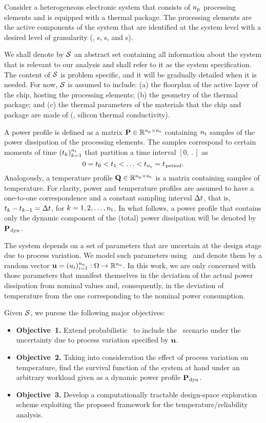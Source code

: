Consider a heterogeneous electronic system that consists of ${n_\text{p}}$ processing elements and is equipped with a thermal package.
The processing elements are the active components of the system that are identified at the system level with a desired level of granularity (\eg, s, s, and s).

We shall denote by $\mathcal{S}$ an abstract set containing all information about the system that is relevant to our analysis and shall refer to it as the system specification.
The content of $\mathcal{S}$ is problem specific, and it will be gradually detailed when it is needed.
For now, $\mathcal{S}$ is assumed to include: (a) the floorplan of the active layer of the chip, hosting the processing elements; (b) the geometry of the thermal package; and (c) the thermal parameters of the materials that the chip and package are made of (\eg, silicon thermal conductivity).

A power profile is defined as a matrix $\mathbf{P} \in \mathbb{R}^{{n_\text{p}} \times {n_\text{t}}}$ containing ${n_\text{t}}$ samples of the power dissipation of the processing elements.
The samples correspond to certain moments of time $(t_k)_{k = 1}^{n_\text{t}}$ that partition a time interval $[0, \period]$ as
\[
  0 = t_0 < t_1 < \dotsc < t_{n_\text{t}} = t_{\text{\kern0.1emperiod}}.
\]
Analogously, a temperature profile $\mathbf{Q} \in \mathbb{R}^{{n_\text{p}} \times {n_\text{t}}}$ is a matrix containing samples of temperature.
For clarity, power and temperature profiles are assumed to have a one-to-one correspondence and a constant sampling interval $\Delta t$, that is, $t_k - t_{k - 1} = \Delta t$, for $k = 1, 2, \dots, {n_\text{t}}$.
In what follows, a power profile that contains only the dynamic component of the (total) power dissipation will be denoted by $\mathbf{P}_{\text{\kern0.1emdyn}}$.

The system depends on a set of parameters that are uncertain at the design stage due to process variation.
We model such parameters using \rvs\ and denote them by a random vector $\mathbf{u} = (u_i)_{i = 1}^{n_\text{u}}: \Omega \to \mathbb{R}^{n_\text{u}}$.
In this work, we are only concerned with those parameters that manifest themselves in the deviation of the actual power dissipation from nominal values and, consequently, in the deviation of temperature from the one corresponding to the nominal power consumption.

Given $\mathcal{S}$, we pursue the following major objectives:
\begin{itemize}
  \item {\bfseries Objective~1.} Extend probabilistic \ta\ to include the \DSS\ scenario under the uncertainty due to process variation specified by $\mathbf{u}$.
  \item {\bfseries Objective~2.} Taking into consideration the effect of process variation on temperature, find the survival function of the system at hand under an arbitrary workload given as a dynamic power profile $\mathbf{P}_{\text{\kern0.1emdyn}}$.
  \item {\bfseries Objective~3.} Develop a computationally tractable design-space exploration scheme exploiting the proposed framework for the temperature/reliability analysis.
\end{itemize}

